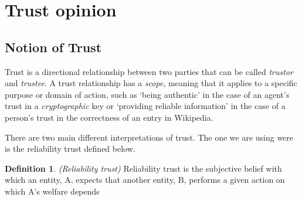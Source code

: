 \documentclass[a4paper,12pt]{article}
\theoremstyle{definition}
\newtheorem{definition}{Definition}[section]
\numberwithin{equation}{section}
\newcommand{\qm}[1]{`#1'}
\newcommand{\red}{\textcolor{red}{red}}
\newcommand{\green}{\textcolor{green(html/cssgreen)}{green}}
\newcommand{\blue}{\textcolor{blue}{blue}}
\begin{document}

%	
%		
%		
%		
%	
%	
%	
%	

\section{Trust opinion}

\subsection{Notion of Trust}

Trust is a directional relationship between two parties that can be called \emph{trustor} and \emph{trustee}. A trust relationship has a \emph{scope}, meaning that it applies to a specific purpose
or domain of action, such as \qm{being authentic} in the case of an agent’s trust in a \emph{cryptographic} key or \qm{providing reliable information} in the case of a person’s trust
in the correctness of an entry in Wikipedia.

There are two main different interpretations of trust. The one we are using were is the reliability trust defined below.

\begin{definition}
	\emph{(Reliability trust)} Reliability trust is the subjective belief with which an entity, A, expects that another entity, B, performs a given action on which A’s welfare depends
\end{definition}
\end{document}
